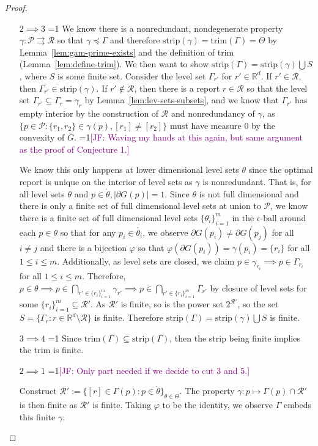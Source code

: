 \documentclass[12pt]{article}
\newcommand{\Comments}{1}
\newcommand{\mynote}[2]{\ifnum\Comments=1\textcolor{#1}{#2}\fi}
\newcommand{\mytodo}[2]{\ifnum\Comments=1%
  \todo[linecolor=#1!80!black,backgroundcolor=#1,bordercolor=#1!80!black]{#2}\fi}
\newcommand{\jessie}[1]{\mynote{purple}{[JF: #1]}}
\newcommand{\jessiet}[1]{\mytodo{purple!20!white}{JF: #1}}
\newcommand{\reals}{\mathbb{R}}
\renewcommand{\P}{\mathcal{P}}
\newcommand{\R}{\mathcal{R}}
\newcommand{\inter}[1]{\mathring{#1}}%
\newcommand{\toto}{\rightrightarrows}
\newcommand{\trim}{\mathrm{trim}}
\newcommand{\strip}{\mathrm{strip}}
\begin{document}
\begin{proof}
\begin{enumerate}
\item [$2 \implies 3$] \jessiet{Cut}
	We know there is a nonredundant, nondegenerate property $\gamma : \P \toto \R$ so that $\gamma \preceq \Gamma$ and therefore $\strip(\gamma) = \trim(\Gamma) = \Theta$ by Lemma~\ref{lem:gam-prime-exists} and the definition of trim (Lemma~\ref{lem:define-trim}).
	We then want to show $\strip(\Gamma) = \strip(\gamma) \bigcup S$, where $S$ is some finite set.
	Consider the level set $\Gamma_{r'}$ for $r' \in \reals^d$.
	If $r' \in \R$, then $\Gamma_{r'} \in \strip(\gamma)$.
	If $r' \not \in \R$, then there is a report $r \in \R$ so that the level set $\Gamma_{r'} \subseteq \Gamma_r = \gamma_r$ by Lemma~\ref{lem:lev-sets-subsets}, and we know that $\Gamma_{r'}$ has empty interior by the construction of $\R$ and nonredundancy of $\gamma$, as $\{p \in \P: \{r_1, r_2\} \in \gamma(p), [r_1] \neq [r_2] \}$ must have measure $0$ by the convexity of $G$.
	\jessie{Waving my hands at this again, but same argument as the proof of Conjecture 1.}

			
	We know this only happens at lower dimensional level sets $\theta$ since the optimal report is unique on the interior of level sets as $\gamma$ is nonredundant.
	That is, for all level sets $\theta$ and $p \in \inter \theta, |\partial G(p)| = 1$.
	Since $\theta$ is not full dimensional and there is only a finite set of full dimensional level sets at union to $\P$, we know there is a finite set of full dimensional level sets $\{\theta_i\}_{i=1}^m$ in the $\epsilon$-ball around each $p \in \theta$ so that for any $p_i \in \inter{\theta_i}$, we observe $\partial G(p_i) \neq \partial G(p_j)$ for all $i \neq j$ and there is a bijection $\varphi$ so that $\varphi(\partial G(p_i)) = \gamma(p_i) = \{r_i\}$ for all $1 \leq i \leq m$.
	Additionally, as level sets are closed, we claim $p \in \gamma_{r_i} \implies p \in \Gamma_{r_i}$ for all $1 \leq i \leq m$.
	Therefore, $p \in \theta \implies p \in \bigcap_{r' \in \{r_i\}_{i=1}^m} \gamma_{r'}\implies p \in \bigcap_{r' \in \{r_i\}_{i=1}^m} \Gamma_{r'}$ by closure of level sets for some $\{r_i\}_{i=1}^m \subseteq \R'$.
	As $\R'$ is finite, so is the power set $2^{\R'}$, so the set $S = \{\Gamma_r : r \in \reals^d \setminus \R \}$ is finite.
	Therefore $\strip(\Gamma) = \strip(\gamma) \bigcup S$ is finite. 
		

\item [$3 \implies 4$]
\jessiet{Cut}
Since $\trim(\Gamma) \subseteq \strip(\Gamma)$, then the strip being finite implies the trim is finite.

\item[$2 \implies 1$]
\jessie{Only part needed if we decide to cut 3 and 5.}

Construct $\R' := \{[r] \in \Gamma(p) : p \in \inter{\theta} \}_{\theta \in \Theta}$.
The property $\gamma: p \mapsto \Gamma(p) \cap\R'$ is then finite as $\R'$ is finite.
Taking $\varphi$ to be the identity, we observe $\Gamma$ embeds this finite $\gamma$.
\end{enumerate} 

\end{proof}
\end{document}
